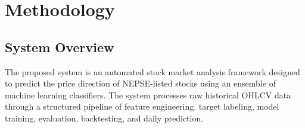 \documentclass[12pt, a4paper]{report}
\begin{document}
	
	\chapter{Methodology}
	
	\section{System Overview}
	The proposed system is an automated stock market analysis framework designed to predict the price direction of NEPSE-listed stocks using an ensemble of machine learning classifiers. The system processes raw historical OHLCV data through a structured pipeline of feature engineering, target labeling, model training, evaluation, backtesting, and daily prediction.
	
\end{document}
